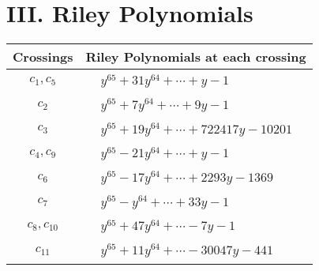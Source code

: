 \documentclass[1p]{elsarticle_modified}
\theoremstyle{definition}
\begin{document}
\centering \section*{ III. Riley Polynomials}
\begin{tabular}{m{50pt}|m{274pt}}
Crossings & \hspace{64pt}Riley Polynomials at each crossing \\
\hline $$\begin{aligned}c_{1},c_{5}\end{aligned}$$&$\begin{aligned}
&y^{65}+31 y^{64}+\cdots+y-1
\end{aligned}$\\
\hline $$\begin{aligned}c_{2}\end{aligned}$$&$\begin{aligned}
&y^{65}+7 y^{64}+\cdots+9 y-1
\end{aligned}$\\
\hline $$\begin{aligned}c_{3}\end{aligned}$$&$\begin{aligned}
&y^{65}+19 y^{64}+\cdots+722417 y-10201
\end{aligned}$\\
\hline $$\begin{aligned}c_{4},c_{9}\end{aligned}$$&$\begin{aligned}
&y^{65}-21 y^{64}+\cdots+y-1
\end{aligned}$\\
\hline $$\begin{aligned}c_{6}\end{aligned}$$&$\begin{aligned}
&y^{65}-17 y^{64}+\cdots+2293 y-1369
\end{aligned}$\\
\hline $$\begin{aligned}c_{7}\end{aligned}$$&$\begin{aligned}
&y^{65}- y^{64}+\cdots+33 y-1
\end{aligned}$\\
\hline $$\begin{aligned}c_{8},c_{10}\end{aligned}$$&$\begin{aligned}
&y^{65}+47 y^{64}+\cdots-7 y-1
\end{aligned}$\\
\hline $$\begin{aligned}c_{11}\end{aligned}$$&$\begin{aligned}
&y^{65}+11 y^{64}+\cdots-30047 y-441
\end{aligned}$\\
\hline
\end{tabular}
\vskip 2pc
\end{document}
